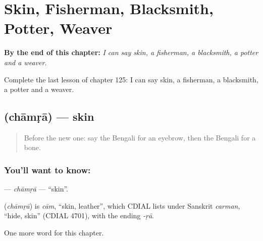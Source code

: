 
\chapter{Skin, Fisherman, Blacksmith, Potter, Weaver}
\label{ch:bn-skin-fisherman-blacksmith-potter-weaver}

\begin{chapteropening}
\textbf{By the end of this chapter:} \emph{I can say skin, a fisherman, a blacksmith, a potter and a weaver.}

Complete the last lesson of chapter 125: I can say skin, a fisherman, a blacksmith, a potter and a weaver.
\end{chapteropening}

\section[\texorpdfstring{\bn{চামড়া} (chāmṛā)}{চামড়া (chāmṛā)}]{ (chāmṛā) — skin}

\label{lesson:BN-C125-chamra}



\begin{quote}
Before the new one: say the Bengali for an eyebrow, then the Bengali for a bone.
\end{quote}

\subsection*{You'll want to know: }
\textbf{} — \emph{chāmṛā} — \textquotedblleft{}skin\textquotedblright{}.

\begin{cousinweb}
\textbf{} (\emph{chāmṛā}) is \emph{cām}, \textquotedblleft{}skin, leather\textquotedblright{}, which CDIAL lists under Sanskrit \emph{carman}, \textquotedblleft{}hide, skin\textquotedblright{} (CDIAL 4701), with the ending \emph{-ṛā}.
\end{cousinweb}

\begin{grammarlens}[title={What you've built}]
One more word for this chapter.
\end{grammarlens}

